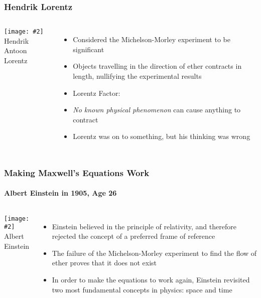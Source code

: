 \documentclass[12pt,compress,aspectratio=169]{beamer}
\newcommand{\pic}[2]{\texttt{[image: \#2]}}
\newcommand{\bigsqrt}{\ensuremath\sqrt{1-\left(\frac{v}{c}\right)^2}}
\newcommand{\lorentz}{\ensuremath\frac{1}{\bigsqrt}}
\newcommand{\eq}[2]{\vspace{#1}{\Large\begin{displaymath}#2\end{displaymath}}}
\begin{document}
\begin{frame}
  \frametitle{Hendrik Lorentz}
  \begin{columns}
    
    \begin{center}
      \pic{1.2}{graphics/lorentz.jpg}\\
      {\footnotesize Hendrik Antoon Lorentz}
    \end{center}
    
    \begin{itemize}
    \item Considered the Michelson-Morley experiment to be significant
    \item Objects travelling in the direction of ether contracts in length,
      nullifying the experimental results
    \item Lorentz Factor:
      
      \eq{-.25in}{
        \boxed{\gamma=\lorentz}
      }
    \item \emph{No known physical phenomenon} can cause anything to contract
    \item Lorentz was on to something, but his thinking was wrong
    \end{itemize}
  \end{columns}
\end{frame}

\begin{frame}
  \frametitle{Making Maxwell's Equations Work}
  \framesubtitle{Albert Einstein in 1905, Age 26}
  \begin{columns}
    \pic{1.1}{graphics/Einstein_patentoffice.jpg}\\
    {\footnotesize Albert Einstein}
  
    \begin{itemize}
    \item Einstein believed in the principle of relativity, and therefore
      rejected the concept of a preferred frame of reference
    \item The failure of the Michelson-Morley experiment to find the flow of
      ether proves that it does not exist
    \item In order to make the equations to work again, Einstein revisited two
      most fundamental concepts in physics: space and time
    \end{itemize}
  \end{columns}
\end{frame}
\end{document}
